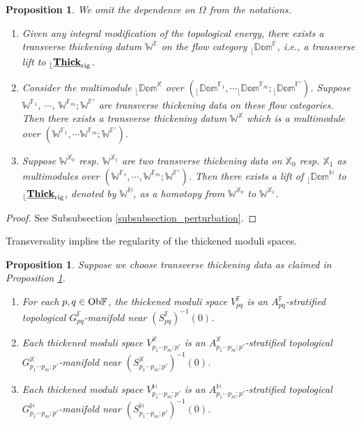 \documentclass[reqno, 10pt]{amsart}
\numberwithin{equation}{section}
\numberwithin{equation}{section}
\newtheorem{prop}[thm]{Proposition}
\theoremstyle{definition}
\theoremstyle{remark}
\newcommand{\mb}{\mathbb}
\renewcommand{\outer}{{}_{\lfloor}}
\newcommand{\uds}[1]{\underline{\smash{#1}}}
\begin{document}
\begin{prop}\label{prop_perturbation} We omit the dependence on $\Omega$ from the notations.
\begin{enumerate}

\item Given any integral modification of the topological energy, there exists a transverse thickening datum $\mb{W}^{\mb F}$ on the flow category $\outer \mb{Dom}^{{\mb F}}$, i.e., a transverse lift to $\outer \uds{\bf Thick}_{\rm rig}$.

\item Consider the multimodule $\outer \mb{Dom}^{\mb{X}}$ over $(\outer \mb{Dom}^{{\mb F}_1}, \cdots \outer \mb{Dom}^{{\mb F}_m}; \outer \mb{Dom}^{{\mb F}'})$. Suppose $\mb{W}^{{\mb F}_1}$, $\cdots$, $\mb{W}^{{\mb F}_m}; \mb{W}^{{\mb F}'}$ are transverse thickening data on these flow categories. Then there exists a transverse thickening datum ${\mb W}^{\mb X}$ which is a multimodule over $(\mb{W}^{{\mb F}_1}, \cdots \mb{W}^{{\mb F}_m}; \mb{W}^{{\mb F}'})$.

\item Suppose $\mb{W}^{{\mb X}_0}$ resp. $\mb{W}^{{\mb X}_1}$ are two transverse thickening data on ${\mb X}_0$ resp. $\mb{X}_1$ as multimodules over $(\mb{W}^{{\mb F}_1}, \cdots, \mb{W}^{{\mb F}_m}; \mb{W}^{{\mb F}'})$. Then there exists a lift of $\outer \mb{Dom}^{{\mb H}}$ to $\outer \uds{\bf Thick}_{\rm rig}$, denoted by $\mb{W}^{{\mb H}}$, as a homotopy from $\mb{W}^{{\mb X}_0}$ to $\mb{W}^{{\mb X}_1}$.
\end{enumerate}
\end{prop}

\begin{proof}
See Subsubsection \ref{subsubsection_perturbation}.
\end{proof}


Transversality implies the regularity of the thickened moduli spaces. 

\begin{prop}
Suppose we choose transverse thickening data as claimed in Proposition \ref{prop_perturbation}.
\begin{enumerate}
    \item For each $p, q \in {\rm Ob}{\mb F}$, the thickened moduli space $V_{pq}^{\mb F}$ is an $A_{pq}^{\mb F}$-stratified topological $G_{pq}^{\mb F}$-manifold near $(S_{pq}^{\mb F})^{-1}(0)$. 

    \item Each thickened moduli space $V_{p_1 \cdots p_m; p'}^{\mb X}$ is an $A_{p_1 \cdots p_m; p'}^{\mb X}$-stratified topological $G_{p_1 \cdots p_m; p'}^{\mb X}$-manifold near $(S_{p_1 \cdots p_m; p'}^{\mb X})^{-1}(0)$.

    \item Each thickened moduli space $V_{p_1 \cdots p_m; p'}^{\mb H}$ is an $A_{p_1 \cdots p_m; p'}^{\mb H}$-stratified topological $G_{p_1 \cdots p_m; p'}^{\mb H}$-manifold near $(S_{p_1 \cdots p_m; p'}^{\mb H})^{-1}(0)$.
    \end{enumerate}
\end{prop}
\end{document}
